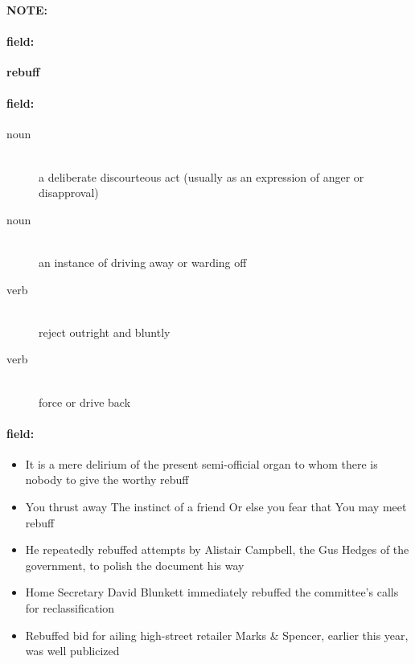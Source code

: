 \documentclass[12pt]{article}
\newenvironment{note}{\paragraph{NOTE:}}{}
\newenvironment{field}{\paragraph{field:}}{}
\begin{document}
\begin{note}
\begin{field}
\textbf{\large rebuff}
\end{field}


\begin{field}
\begin{description}
\item[noun] \hfill \\ 
a deliberate discourteous act (usually as an expression of anger or disapproval)

\item[noun] \hfill \\ 
an instance of driving away or warding off

\item[verb] \hfill \\ 
reject outright and bluntly

\item[verb] \hfill \\ 
force or drive back

\end{description}
\end{field}

\begin{field}
\begin{itemize}
\item It is a mere delirium of the present semi-official organ to whom there is nobody to give the worthy rebuff
\item You thrust away The instinct of a friend  Or else you fear that You may meet rebuff
\item He repeatedly rebuffed attempts by Alistair Campbell, the Gus Hedges of the government, to polish the document his way
\item Home Secretary David Blunkett immediately rebuffed the committee's calls for reclassification
\item Rebuffed bid for ailing high-street retailer Marks & Spencer, earlier this year, was well publicized
\end{itemize}
\end{field}
\end{note}
\end{document}
